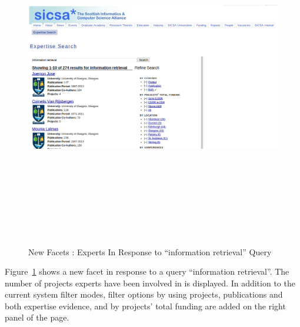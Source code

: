 \begin{figure}
 \centering
 \includegraphics[width=13cm,height=15cm,keepaspectratio]{./figures/newsearch.png}
 \caption{New Facets : Experts In Response to ``information retrieval'' Query} \label{fig:newsearch} 
 \end{figure}
 Figure~\ref{fig:newsearch} shows a new facet in response to a query ``information retrieval''. The number of 
projects experts have been involved in is displayed. In addition to the current system filter modes, filter options by using projects, publications and both
expertise evidence, and by projects' total funding are added on the right panel of the page.


